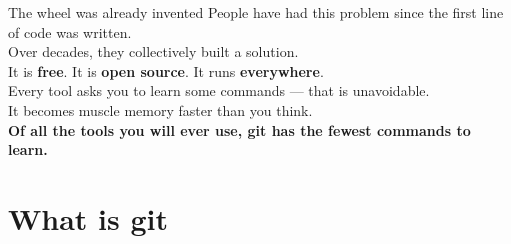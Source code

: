 \documentclass[aspectratio=169]{beamer}
\begin{document}
\begin{frame}{The wheel was already invented}
    \centering
    \vspace{0.5em}
    People have had this problem since the first line of code was written.\\
    \vspace{1em}
    \pause
    Over decades, they collectively built a solution.\\
    It is \textbf{free}. \; It is \textbf{open source}. \; It runs \textbf{everywhere}.\\
    \vspace{0.8em}
    \pause
    Every tool asks you to learn some commands --- that is unavoidable.\\[4pt]
    It becomes muscle memory faster than you think.\\[4pt]
    \pause
    \textbf{Of all the tools you will ever use, git has the fewest commands to learn.}
\end{frame}

\section{What is git}
\end{document}
